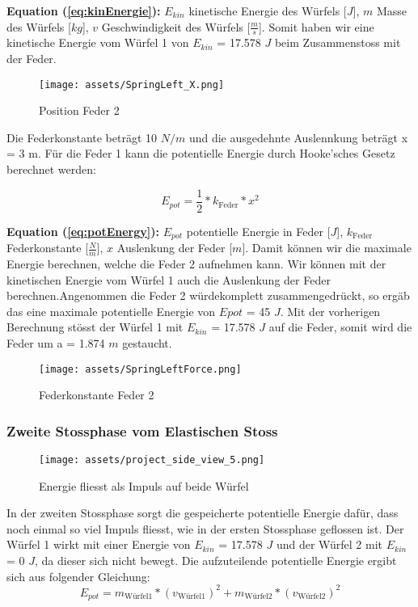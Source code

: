 \documentclass{article}
\begin{document}
\scriptsize
\textbf{Equation (\ref{eq:kinEnergie}):} $E_{kin}$ kinetische Energie des Würfels [$J$], $m$ Masse des Würfels [$kg$], $v$ Geschwindigkeit des Würfels [$\frac{m}{s}$].
\normalsize
\medskip
\newline
Somit haben wir eine kinetische Energie vom Würfel 1 von $E_{kin}$ = 17.578 $J$ beim Zusammenstoss mit der Feder.
\begin{figure}[H] 
\centering\texttt{[image: assets/SpringLeft\_X.png]}
\scriptsize
\caption{Position Feder 2}
\label{fig:SpringLeft_X}
\end{figure}

\noindent
Die Federkonstante beträgt 10 $N/m$ und die ausgedehnte Auslennkung beträgt x = 3 m. Für die Feder 1 kann die potentielle Energie durch Hooke'sches Gesetz berechnet werden:

\begin{equation}\label{eq:potEnergy}
E_{pot} = \frac{1}{2} *  k_{\text{Feder}} * x^2
\end{equation}

\scriptsize
\textbf{Equation (\ref{eq:potEnergy}):} $E_{pot}$ potentielle Energie in Feder [$J$], $k_{\text{Feder}}$ Federkonstante [$\frac{N}{m}$], $x$ Auslenkung der Feder [$m$].
\normalsize
\medskip
\newline
Damit können wir die maximale Energie berechnen, welche die Feder 2 aufnehmen kann. Wir können mit der kinetischen Energie vom Würfel 1 auch die Auslenkung der Feder berechnen.Angenommen die Feder 2 würdekomplett zusammengedrückt, so ergäb das eine maximale potentielle Energie von $Epot$ = 45 $J$.
Mit der vorherigen Berechnung stösst der Würfel 1 mit $E_{kin}$ = 17.578 $J$ auf die Feder, somit wird die Feder um a = 1.874 $m$ gestaucht.

\begin{figure}[H] 
\centering\texttt{[image: assets/SpringLeftForce.png]}
\scriptsize
\caption{Federkonstante Feder 2}
\label{fig:SpringLeftForce}
\end{figure}
\normalsize
\medskip
\noindent

\subsubsection{Zweite Stossphase vom Elastischen Stoss}
\begin{figure}[H] 
\centering\texttt{[image: assets/project\_side\_view\_5.png]}
\scriptsize
\caption{Energie fliesst als Impuls auf beide Würfel}
\label{fig:project_side_view_5}
\end{figure}
In der zweiten Stossphase sorgt die gespeicherte potentielle Energie dafür, dass noch einmal so viel Impuls fliesst, wie in der ersten Stossphase geflossen ist. Der Würfel 1 wirkt mit einer Energie von $E_{kin}$ = 17.578 $J$ und der Würfel 2 mit $E_{kin}$ = 0 $J$, da dieser sich nicht bewegt. Die aufzuteilende potentielle Energie ergibt sich aus folgender Gleichung:
\begin{equation}\label{eq:impulserhalt}
E_{pot} = m_{\text{Würfel1}} * (v_{\text{Würfel1}})^2 +  m_{\text{Würfel2}} * (v_{\text{Würfel2}})^2
\end{equation}
\end{document}
